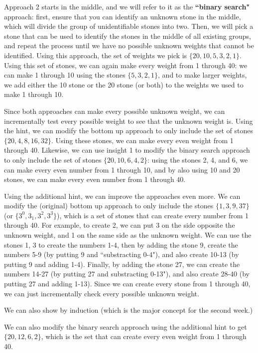 \documentclass[twoside,12pt]{article}
\begin{document}
\begin{problem}{16}
{Approach 2 starts in the middle, and we will refer to it as the \textbf{``binary search"} approach: first, 
ensure that you can identify an unknown stone in the middle, which will divide the group of unidentifiable 
stones into two.  Then, we will pick a stone that can be used to identify the stones in the middle of all existing 
groups, and repeat the process until we have no possible unknown weights that cannot be identified.  Using 
this approach, the set of weights we pick is $\{  20, 10, 5, 3, 2, 1 \}$.  Using this set of stones, we can again 
make every weight from 1 through 40: we can make 1 through 10 using the stones $\{  5, 3, 2, 1 \}$, and to 
make larger weights, we add either the 10 stone or the 20 stone (or both) to the weights we used to make 1 through 10.

Since both approaches can make every possible unknown weight, we can incrementally test every possible weight to see that 
the unknown weight is.  Using the hint, we can modify the bottom up approach to only include the set of stones 
$\{  20, 4, 8, 16, 32 \}$.  Using these stones, we can make every even weight from 1 through 40.  Likewise, we can use 
insight 1 to modify the binary search approach to only include the set of stones $\{  20, 10, 6, 4, 2 \}$: using the stones 2, 4, and 
6, we can make every even number from 1 through 10, and by also using 10 and 20 stones, we can make every even number 
from 1 through 40.  

Using the additional hint, we can improve the approaches even more.  We can modify the (original) bottom up approach 
to only include the stones $ \{ 1, 3, 9, 37 \}$ (or $\{3^{0}, 3_{1}, 3^{2}, 3^{3} \}$), which is a set of stones that can create every 
number from 1 through 40.  For example, to create 2, we can put 3 on the side opposite the unknown weight, and 1 on the same side as 
the unknown weight.  We can use the stones 1, 3 to create the numbers 1-4, then by adding the stone 9, create the numbers 5-9 (by putting 9 and ``substracting 0-4"), and also create 10-13 (by putting 9 and adding 1-4).  Finally, by adding the stone 27, we can 
create the numbers 14-27 (by putting 27 and substracting 0-13"), and also create 28-40 (by putting 27 and adding 1-13).  
Since we can create every stone from 1 through 40, we can just incrementally check every possible unknown weight.  

We can also show by induction (which is the major concept for the second week.) 

We can also modify the binary search approach using the additional hint to get $\{20, 12, 6, 2 \}$, which is the set that can create 
every even weight from 1 through 40.  

}

\end{problem}
\end{document}
